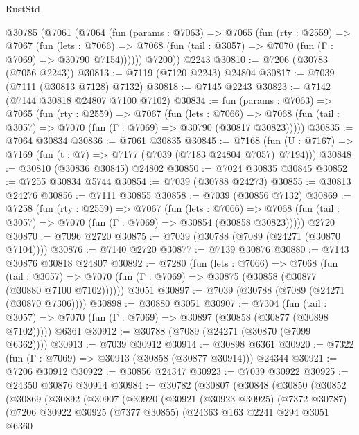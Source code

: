 \begin{lexlean}{RustStd}
\begin{coremodule}
    @30785
      (@7061
        (@7064
          (fun (params : @7063) =>
          @7065
            (fun (rty : @2559) =>
            @7067
              (fun (lets : @7066) =>
              @7068 (fun (tail : @3057) => @7070 (fun (Γ : @7069) => @30790 @7154))))))
        @7200))
    @2243
@30810 := @7206 (@30783 (@7056 @2243))
@30813 := @7119 (@7120 @2243) @24804
@30817 := @7039 (@7111 (@30813 @7128) @7132)
@30818 := @7145 @2243
@30823 := @7142 (@7144 @30818 @24807 @7100 @7102)
@30834 := fun (params : @7063) =>
  @7065
    (fun (rty : @2559) =>
    @7067
      (fun (lets : @7066) =>
      @7068 (fun (tail : @3057) => @7070 (fun (Γ : @7069) => @30790 (@30817 @30823)))))
@30835 := @7064 @30834
@30836 := @7061 @30835
@30845 := @7168
    (fun (U : @7167) => @7169 (fun (t : @7) => @7177 (@7039 (@7183 @24804 @7057) @7194)))
@30848 := @30810 (@30836 @30845) @24802
@30850 := @7024 @30835 @30845
@30852 := @7255 @30834 @5744
@30854 := @7039 (@30788 @24273)
@30855 := @30813 @24276
@30856 := @7111 @30855
@30858 := @7039 (@30856 @7132)
@30869 := @7258
    (fun (rty : @2559) =>
    @7067
      (fun (lets : @7066) =>
      @7068 (fun (tail : @3057) => @7070 (fun (Γ : @7069) => @30854 (@30858 @30823)))))
    @2720
@30870 := @7096 @2720
@30875 := @7039 (@30788 (@7089 (@24271 (@30870 @7104))))
@30876 := @7140 @2720
@30877 := @7139 @30876
@30880 := @7143 @30876 @30818 @24807
@30892 := @7280
    (fun (lets : @7066) =>
    @7068
      (fun (tail : @3057) =>
      @7070 (fun (Γ : @7069) => @30875 (@30858 (@30877 (@30880 @7100 @7102))))))
    @3051
@30897 := @7039 (@30788 (@7089 (@24271 (@30870 @7306))))
@30898 := @30880 @3051
@30907 := @7304
    (fun (tail : @3057) => @7070 (fun (Γ : @7069) => @30897 (@30858 (@30877 (@30898 @7102)))))
    @6361
@30912 := @30788 (@7089 (@24271 (@30870 (@7099 @6362))))
@30913 := @7039 @30912
@30914 := @30898 @6361
@30920 := @7322 (fun (Γ : @7069) => @30913 (@30858 (@30877 @30914))) @24344
@30921 := @7206 @30912
@30922 := @30856 @24347
@30923 := @7039 @30922
@30925 := @24350 @30876 @30914
@30984 := @30782
    (@30807
      (@30848
        (@30850
          (@30852
            (@30869
              (@30892
                (@30907
                  (@30920
                    (@30921
                      (@30923 @30925)
                      (@7372 @30787)
                      (@7206
                        @30922
                        @30925
                        (@7377 @30855)
                        (@24363
                          @163
                          @2241
                          @294
                          @3051
                          @6360

\end{coremodule}
\end{lexlean}
